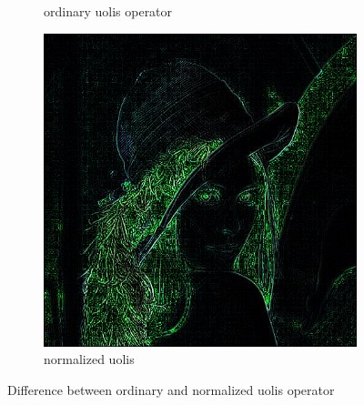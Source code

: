\documentclass[12pt]{article}
\begin{document}
\begin{figure}[H]
\begin{subfigure}[t]{\subfiguresize}
        \caption{ordinary uolis operator}
    \end{subfigure}
    \hfill
    \begin{subfigure}[t]{\subfiguresize}
        \includegraphics[width=\textwidth]{lena_uolis_normalized.png}
        \caption{normalized uolis}
    \end{subfigure}
    \hfill
    \caption{Difference between ordinary and normalized uolis operator}
    \label{fig:uolis}
\end{figure}
\end{document}
